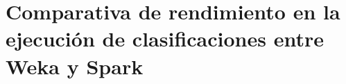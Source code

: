 \begin{comment}
\newpage
\subsection{Funciones lambda en Java 8 } \label{subsec:ExplLambdaJava}

En Spark, es habitual usar funciones como parámetros de muchas transformaciones y acciones que aplicamos sobre las RDD (ver sección \ref{sec:DefRDD}). Estas funciones, por lo general, son requeridas solamente para la operación concreta, por lo que se suelen definir directamente en el código.

Esto, antes de la llegada de Java 8, generaba un código semejante al siguiente:

\begin{lstlisting}[language=Java,tabsize=4,frame = single,caption=Código de función lambda en Java 7 \cite{Java7vs8},captionpos=b,]
JavaSparkContext sc = new JavaSparkContext()
JavaRDD<String> lines = sc.textFile("hdfs://log.txt")
	.filter(new Function<String, Boolean>() {
		public Boolean call(String s) {
			return s.contains("err");
		}
	});
\end{lstlisting}

Mientras que con Java 8, el código se reduce a:

\begin{lstlisting}[language=Java,tabsize=4,frame = single,caption=Código de función lambda en Java 8 \cite{Java7vs8},captionpos=b,]
JavaSparkContext sc = new JavaSparkContext()
JavaRDD<String> lines = sc.textFile("hdfs://log.txt")
     .filter(s -> s.contains("err"));
\end{lstlisting}

Dado que, como hemos dicho, este tipo de operaciones van a ser enormemente comunes en el desarrollo de algoritmos para Spark, el hecho de poder usar Java 8 puede reducir significativamente el número de líneas de código y, además, facilitar la comprensión del programa.

El uso continuo que se pueden dar a las funciones lambda en la programación con Spark ya se comprobó cuando se intentó programar con Java para Spark.
\end{comment}


\section{Comparativa de rendimiento en la ejecución de clasificaciones entre Weka y Spark}


